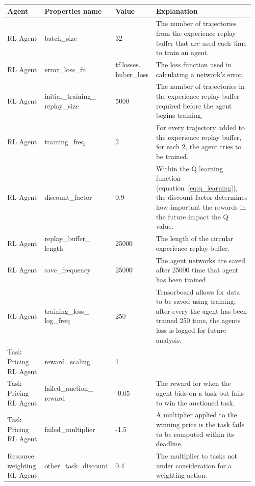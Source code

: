 \begin{longtable}{|p{2cm}|p{3.5cm}|p{2.5cm}|p{6cm}|} \hline
    \textbf{Agent} & \textbf{Properties name} & \textbf{Value} & \textbf{Explanation} \\ \hline
        RL Agent & batch\_size & 32 & The number of trajectories from the experience replay buffer that are used each
            time to train an agent. \\ \hline
        RL Agent & error\_loss\_fn & tf.losses. huber\_loss & The loss function used in calculating a network's error. \\ \hline
        RL Agent & initial\_training\_ replay\_size & 5000 & The number of trajectories in the experience replay buffer
            required before the agent begins training. \\ \hline
        RL Agent & training\_freq & 2 & For every trajectory added to the experience replay buffer, for each 2, the
            agent tries to be trained. \\ \hline
        RL Agent & discount\_factor & 0.9 & Within the Q learning function (equation~\eqref{eq:q_learning}), the
            discount factor determines how important the rewards in the future impact the Q value. \\ \hline
        RL Agent & replay\_buffer\_ length & 25000 & The length of the circular experience replay buffer. \\ \hline
        RL Agent & save\_frequency & 25000 & The agent networks are saved after 25000 time that agent has been trained
            \\ \hline
        RL Agent & training\_loss\_ log\_freq & 250 & Tensorboard allows for data to be saved using training, after every
            the agent has been trained 250 time, the agents loss is logged for future analysis. \\ \hline
        Task Pricing RL Agent & reward\_scaling & 1 & \\ \hline
        Task Pricing RL Agent & failed\_auction\_ reward & -0.05 & The reward for when the agent bids on a task but fails
            to win the auctioned task. \\ \hline
        Task Pricing RL Agent & failed\_multiplier & -1.5 & A multiplier applied to the winning price is the task fails
            to be computed within its deadline. \\ \hline
        Resource weighting RL Agent & other\_task\_discount & 0.4 & The multiplier to tasks not under consideration for
            a weighting action. \\ \hline

\end{longtable}
